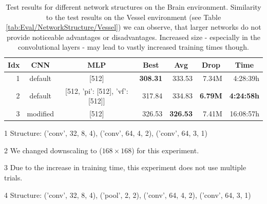 \begin{table}[htp]
    \begin{center}
        \begin{threeparttable}
            \begin{tabular}{rccrrrr}
                \toprule
                \multicolumn{1}{c}{Idx} & \multicolumn{1}{c}{CNN} & \multicolumn{1}{c}{MLP} & \multicolumn{1}{c}{Best} & \multicolumn{1}{c}{Avg} & \multicolumn{1}{c}{Drop} & \multicolumn{1}{c}{Time}\\
                \midrule
                1 & default\tnote{1} & [512] & \textbf{308.31} & 333.53 & 7.34M & 4:28:39h \\
                2 & default\tnote{1} & [512, {'pi': [512], 'vf': [512]}] & 317.84 & 334.83 & \textbf{6.79M} & \textbf{4:24:58h} \\
                3\tnote{2,3} & modified\tnote{4} & [512] & 326.53 & \textbf{326.53}\tnote{3} & 7.41M & 16:08:57h \\
                \bottomrule
            \end{tabular}
            \begin{tablenotes} \footnotesize
                \item[1] Structure: ('conv', 32, 8, 4), ('conv', 64, 4, 2), ('conv', 64, 3, 1)
                \item[2] We changed downscaling to ($168 \times 168$) for this experiment.
                \item[3] Due to the increase in training time, this experiment does not use multiple trials. 
                \item[4] Structure: ('conv', 32, 8, 4), ('pool', 2, 2), ('conv', 64, 4, 2), ('conv', 64, 3, 1)
            \end{tablenotes}
        \end{threeparttable}
    \end{center}
    \caption[Test Results for Different Network Structures on the Brain Environment]{Test results for different network structures on the Brain environment. Similarity to the test results on the Vessel environment (see Table \ref{tab:Eval/NetworkStructure/Vessel}) we can observe, that larger networks do not provide noticeable advantages or disadvantages. Increased size - especially in the convolutional layers - may lead to vastly increased training times though.} \label{tab:Eval/NetworkStructure/Brain}
\end{table}

